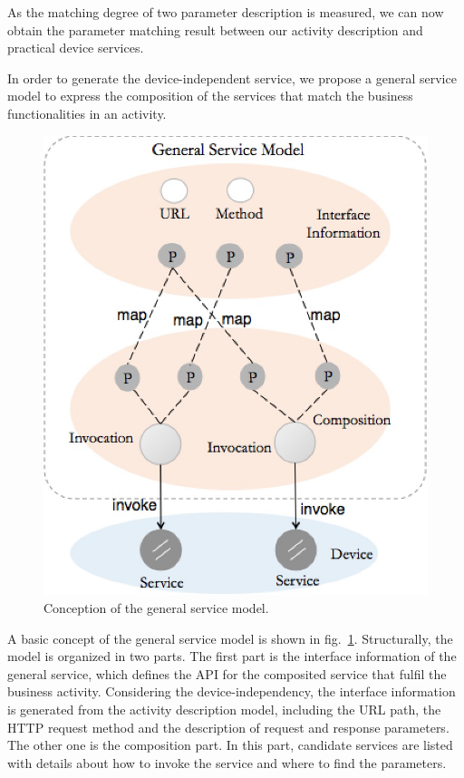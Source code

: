 As the matching degree of two parameter description is measured, we can now obtain the parameter matching result between our activity description and practical device services. 

In order to generate the device-independent service, we propose a general service model to express the composition of the services that match the business functionalities in an activity. 

\begin{figure}[!t]
\centering
\includegraphics[width=1.0\linewidth]{./graph/generalservicemodel}
\caption{Conception of the general service model.}
\label{fig_generalservice}
\end{figure}

A basic concept of the general service model is shown in fig.~\ref{fig_generalservice}. Structurally, the model is organized in two parts. The first part is the interface information of the general service, which defines the API for the composited service that fulfil the business activity. Considering the device-independency, the interface information is generated from the activity description model, including the URL path, the HTTP request method and the description of request and response parameters. The other one is the composition part. In this part, candidate services are listed with details about how to invoke the service and where to find the parameters. 

